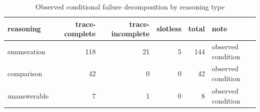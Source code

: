 \begin{table}[htbp]
\centering
\footnotesize
\setlength{\tabcolsep}{3pt}
\caption{Observed conditional failure decomposition by reasoning type}
\label{tab:d5c-reasoning-failure-decomposition}
\begin{tabularx}{\linewidth}{>{\raggedright\arraybackslash}Xrrrr>{\raggedright\arraybackslash}X}
\toprule
reasoning & trace-complete & trace-incomplete & slotless & total & note \\
\midrule
enumeration & 118 & 21 & 5 & 144 & observed condition \\
comparison & 42 & 0 & 0 & 42 & observed condition \\
unanswerable & 7 & 1 & 0 & 8 & observed condition \\
\bottomrule
\end{tabularx}
\end{table}
